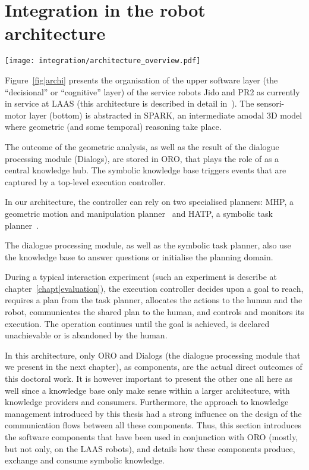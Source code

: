 \section{Integration in the robot architecture}

\begin{figure*}[thpb]
  \centering
  \texttt{[image: integration/architecture\_overview.pdf]}

  \caption {Software architecture of PR2 and Jido, two service robot
  interacting with humans at LAAS-CNRS.}

  \label{fig|archi}
\end{figure*}

Figure~\ref{fig|archi} presents the organisation of the upper software layer
(the ``decisional'' or ``cognitive'' layer) of the service robots Jido and PR2
as currently in service at LAAS (this architecture is described in detail
in~\cite{Alami2011}). The sensori-motor layer (bottom) is abstracted in SPARK,
an intermediate amodal 3D model where geometric (and some temporal) reasoning
take place.

The outcome of the geometric analysis, as well as the result of the dialogue
processing module ({\sc Dialogs}), are stored in ORO, that plays the role of as
a central knowledge hub. The symbolic knowledge base triggers events that are
captured by a top-level execution controller.

In our architecture, the controller can rely on two specialised planners: MHP,
a geometric motion and manipulation planner~\cite{Sisbot2008, Mainprice2011,
Pandey2010} and HATP, a symbolic task planner~\cite{Alili2009}.

The dialogue processing module, as well as the symbolic task planner, also use
the knowledge base to answer questions or initialise the planning domain.

During a typical interaction experiment (such an experiment is describe at
chapter~\ref{chapt|evaluation}), the execution controller decides upon a goal
to reach, requires a plan from the task planner, allocates the actions to the
human and the robot, communicates the shared plan to the human, and controls
and monitors its execution. The operation continues until the goal is achieved,
is declared unachievable or is abandoned by the human.

In this architecture, only ORO and Dialogs (the dialogue processing module that
we present in the next chapter), as components, are the actual direct outcomes
of this doctoral work. It is however important to present the other one all
here as well since a knowledge base only make sense within a larger
architecture, with knowledge providers and consumers.  Furthermore, the
approach to knowledge management introduced by this thesis had a strong
influence on the design of the communication flows between all these
components. Thus, this section introduces the software components that have
been used in conjunction with ORO (mostly, but not only, on the LAAS robots),
and details how these components produce, exchange and consume symbolic
knowledge.

